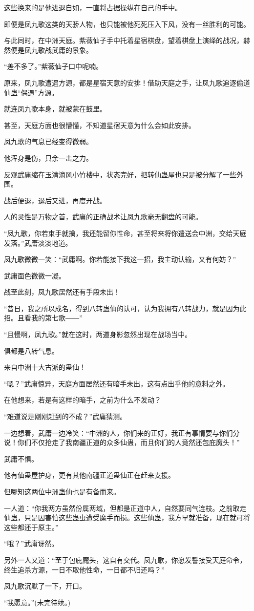 \begin{this_body}
这些换来的是他进退自如，一直将占据操纵在自己的手中。

即便是凤九歌这类的天骄人物，也只能被他死死压入下风，没有一丝胜利的可能。

与此同时，在中洲天庭。紫薇仙子手中托着星宿棋盘，望着棋盘上演绎的战况，赫然便是凤九歌战武庸的景象。

“差不多了。”紫薇仙子口中呢喃。

原来，凤九歌遭遇方源，都是星宿天意的安排！借助天庭之手，让凤九歌追逐偷道仙蛊“偶遇”方源。

就连凤九歌本身，就被蒙在鼓里。

甚至，天庭方面也很懵懂，不知道星宿天意为什么会如此安排。

凤九歌的气息已经变得微弱。

他浑身是伤，只余一击之力。

反观武庸缩在玉清滴风小竹楼中，状态完好，把转仙蛊屋也只是被分解了一些外围。

战后便退，退后又进，再度开战。

人的灵性是万物之首，武庸的正确战术让凤九歌毫无翻盘的可能。

“凤九歌，你若束手就擒，我还能留你性命，甚至将来将你遣送会中洲，交给天庭发落。”武庸淡淡地道。

凤九歌微微一笑：“武庸啊。你若能接下我这一招，我主动认输，又有何妨？”

武庸面色微微一凝。

战至此刻，凤九歌居然还有手段未出！

“昔日，我之所以成名，得到八转蛊仙的认可，认为我拥有八转战力，就是因为此招。且看我的第七歌――”

“且慢啊，凤九歌。”就在这时，两道身影忽然出现在战场当中。

俱都是八转气息。

来自中洲十大古派的蛊仙！

“嗯？”武庸惊异，天庭方面居然还有暗手未出，这有点出乎他的意料之外。

在他想来，若是有这样的暗手，之前为什么不发动？

“难道说是刚刚赶到的不成？”武庸猜测。

一边想着，武庸一边冷笑：“中洲的人，你们来的正好，我正有事情要与你们分说！你们不仅抢走了我南疆正道的众多仙蛊，而且你们的人竟然还包庇魔头！”

武庸不惧。

他有仙蛊屋护身，更有其他南疆正道蛊仙正在赶来支援。

但哪知这两位中洲蛊仙也是有备而来。

一人道：“你我两方虽然份属两域，但都是正道中人，自然要同气连枝。之前取走仙蛊，只是因害怕这些蛊虫遭受魔手而损。这些仙蛊，我方早就准备，现在就可将这些都还于原主。”

“哦？”武庸讶然。

另外一人又道：“至于包庇魔头，这自有交代。凤九歌，你愿发誓接受天庭命令，终生追杀方源，一日不取他性命，一日都不归还吗？”

凤九歌沉默了一下，开口。

“我愿意。”(未完待续。)

\end{this_body}

